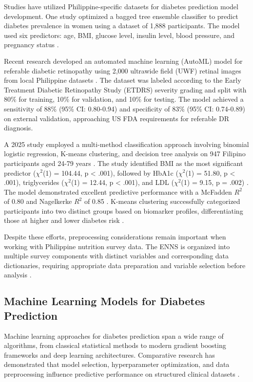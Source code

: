 Studies have utilized Philippine-specific datasets for diabetes prediction model development. One study optimized a bagged tree ensemble classifier to predict diabetes prevalence in women using a dataset of 1,888 participants. The model used six predictors: age, BMI, glucose level, insulin level, blood pressure, and pregnancy status \cite{candia_bagged_trees_2024}.

Recent research developed an automated machine learning (AutoML) model for referable diabetic retinopathy using 2,000 ultrawide field (UWF) retinal images from local Philippine datasets \cite{arcena_automl_2024}. The dataset was labeled according to the Early Treatment Diabetic Retinopathy Study (ETDRS) severity grading and split with 80\% for training, 10\% for validation, and 10\% for testing. The model achieved a sensitivity of 88\% (95\% CI: 0.80-0.94) and specificity of 83\% (95\% CI: 0.74-0.89) on external validation, approaching US FDA requirements for referable DR diagnosis.

A 2025 study employed a multi-method classification approach involving binomial logistic regression, K-means clustering, and decision tree analysis on 947 Filipino participants aged 24-79 years \cite{campugan_diabetes_2025}. The study identified BMI as the most significant predictor ($\chi^2$(1) = 104.44, p < .001), followed by HbA1c ($\chi^2$(1) = 51.80, p < .001), triglycerides ($\chi^2$(1) = 12.44, p < .001), and LDL ($\chi^2$(1) = 9.15, p = .002) \cite{campugan_diabetes_2025}. The model demonstrated excellent predictive performance with a McFadden $R^2$ of 0.80 and Nagelkerke $R^2$ of 0.85 \cite{campugan_diabetes_2025}. K-means clustering successfully categorized participants into two distinct groups based on biomarker profiles, differentiating those at higher and lower diabetes risk \cite{campugan_diabetes_2025}.

Despite these efforts, preprocessing considerations remain important when working with Philippine nutrition survey data. The ENNS is organized into multiple survey components with distinct variables and corresponding data dictionaries, requiring appropriate data preparation and variable selection before analysis \cite{dostfnri_enutrition_puf}.

\subsection{Machine Learning Models for Diabetes Prediction}

Machine learning approaches for diabetes prediction span a wide range of algorithms, from classical statistical methods to modern gradient boosting frameworks and deep learning architectures. Comparative research has demonstrated that model selection, hyperparameter optimization, and data preprocessing influence predictive performance on structured clinical datasets \cite{mao_diabetes_ml_2023, grinsztajn_tabular_2022}.

